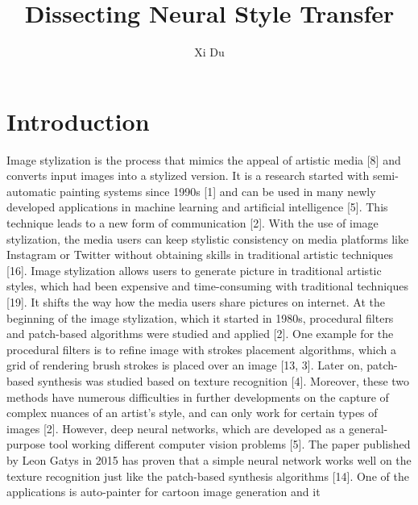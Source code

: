 \documentclass[runningheads]{llncs}
\begin{document}
\title{Dissecting Neural Style Transfer}
\author{Xi Du}
\maketitle 
\begin{abstract}
\cite{method}

\end{abstract}

\section{Introduction}

Image stylization is the process that mimics the appeal of artistic media [8] 
and converts input images into a stylized version. It is a research started with
semi-automatic painting systems since 1990s [1] and can be used in many newly 
developed applications in machine learning and artificial intelligence [5]. 
This technique leads to a new form of communication [2]. With the use of image 
stylization, the media users can keep stylistic consistency on media platforms 
like Instagram or Twitter without obtaining skills in traditional artistic 
techniques [16]. Image stylization allows users to generate picture in 
traditional artistic styles, which had been expensive and time-consuming with 
traditional techniques [19]. It shifts the way how the media users share 
pictures on internet. At the beginning of the image stylization, which it 
started in 1980s, procedural filters and patch-based algorithms were studied 
and applied [2]. One example for the procedural filters is to refine image 
with strokes placement algorithms, which a grid of rendering brush strokes is 
placed over an image [13, 3]. Later on, patch-based synthesis was studied based 
on texture recognition [4]. Moreover, these two methods have numerous 
difficulties in further developments on the capture of complex nuances of an 
artist’s style, and can only work for certain types of images [2]. However, 
deep neural networks, which are developed as a general-purpose tool working 
different computer vision problems [5].  The paper published by Leon Gatys in 
2015 has proven that a simple neural network works well on the texture 
recognition just like the patch-based synthesis algorithms [14]. 
One of the applications is auto-painter for cartoon image generation and it 
\end{document}
